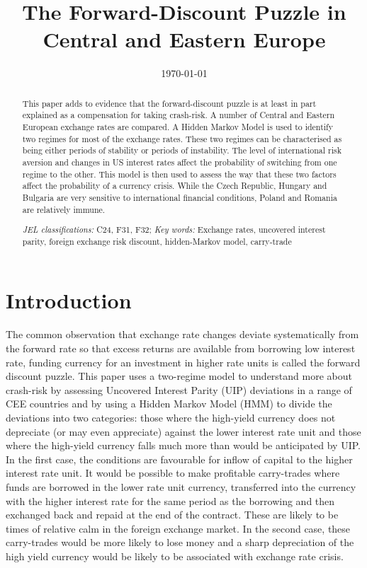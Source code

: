 \documentclass[12pt, a4paper, oneside]{article}\usepackage[]{graphicx}\usepackage[]{color}
\begin{document}
\title{The Forward-Discount Puzzle in Central and Eastern Europe}
  
\date{\today}
\maketitle
\begin{abstract}
This paper adds to evidence that the forward-discount puzzle is at least in part explained as a compensation for taking crash-risk. A number of Central and Eastern European exchange rates are compared. A Hidden Markov Model is used to identify two regimes for most of the exchange rates.  These two regimes can be characterised as being either periods of stability or periods of instability. The level of international risk aversion and changes in US interest rates affect the probability of switching from one regime to the other. This model is then used to assess the way that these two factors affect the probability of a currency crisis. While the Czech Republic,  Hungary and Bulgaria are very sensitive to international financial conditions, Poland and Romania are relatively immune.  

\emph{JEL classifications:} C24, F31, F32; 
\emph{Key words:} Exchange rates, uncovered interest parity, foreign exchange risk discount, hidden-Markov model, carry-trade


\end{abstract}

\section{Introduction}
The common observation that exchange rate changes deviate systematically from the forward rate so that excess returns are available from borrowing low interest rate, funding currency for an investment in higher rate units is called the forward discount puzzle.   This paper uses a two-regime model to understand more about crash-risk by assessing Uncovered Interest Parity (UIP) deviations in a range of CEE countries and by using a Hidden Markov Model (HMM) to divide the deviations into two categories: those where the high-yield currency does not depreciate (or may even appreciate) against the lower interest rate unit and those where the high-yield currency falls much more than would be anticipated by UIP.  In the first case, the conditions are favourable for inflow of capital to the higher interest rate unit.  It would be possible to make profitable carry-trades where funds are borrowed in the lower rate unit currency, transferred into the currency with the higher interest rate for the same period as the borrowing and then exchanged back and repaid at the end of the contract. These are likely to be times of relative calm in the foreign exchange market. In the second case, these carry-trades would be more likely to lose money and a sharp depreciation of the high yield currency would be likely to be associated with exchange rate crisis. 
\end{document}
